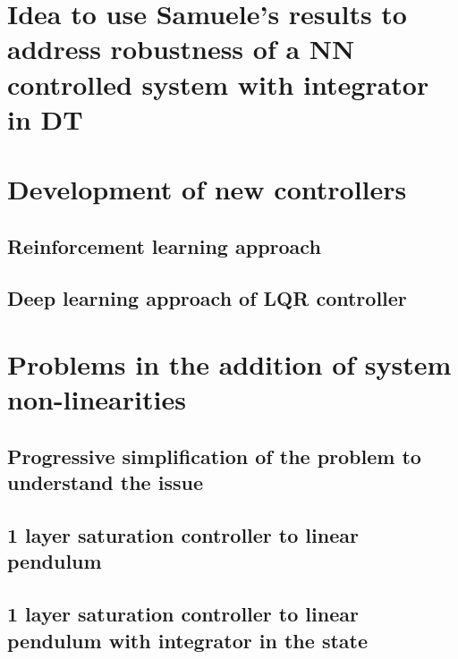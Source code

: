 \documentclass{article}
\begin{document}
\section*{Idea to use Samuele's results to address robustness of a NN controlled system with integrator in DT}

\section*{Development of new controllers}

\subsection*{Reinforcement learning approach}

\subsection*{Deep learning approach of LQR controller} 

\section*{Problems in the addition of system non-linearities} 

\subsection*{Progressive simplification of the problem to understand the issue}

\subsection*{1 layer saturation controller to linear pendulum}

\subsection*{1 layer saturation controller to linear pendulum with integrator in the state}




\pagebreak
\printbibliography
\end{document}
